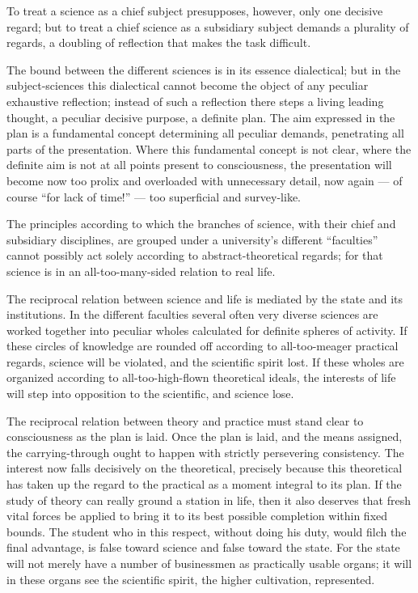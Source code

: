 \documentclass[12pt]{book}
\begin{document}
To treat a science as a chief subject presupposes, however, only one decisive regard; but to
treat a chief science as a subsidiary subject demands a plurality of regards, a doubling of
reflection that makes the task difficult.

The bound between the different sciences is in its essence dialectical; but in the
subject-sciences this dialectical cannot become the object of any peculiar exhaustive
reflection; instead of such a reflection there steps a living leading thought, a peculiar
decisive purpose, a definite plan. The aim expressed in the plan is a fundamental concept
determining all peculiar demands, penetrating all parts of the presentation. Where this
fundamental concept is not clear, where the definite aim is not at all points present to
consciousness, the presentation will become now too prolix and overloaded with unnecessary
detail, now again — of course ``for lack of time!'' — too superficial and survey-like.

The principles according to which the branches of science, with their chief and subsidiary
disciplines, are grouped under a university's
different ``faculties'' cannot possibly act solely according to abstract-theoretical regards;
for that science is in an all-too-many-sided relation to real life.

The reciprocal relation between science and life is mediated by the state and its
institutions. In the different faculties several often very diverse sciences are worked
together into peculiar wholes calculated for definite spheres of activity. If these circles
of knowledge are rounded off according to all-too-meager practical regards, science will be
violated, and the scientific spirit lost. If these wholes are organized according to
all-too-high-flown theoretical ideals, the interests of life will step into opposition to the
scientific, and science lose.

The reciprocal relation between theory and practice must stand clear to consciousness as the
plan is laid. Once the plan is laid, and the means assigned, the carrying-through ought to
happen with strictly persevering consistency. The interest now falls decisively on the
theoretical, precisely because this theoretical has taken up the regard to the practical as a
moment integral to its plan. If the study of theory can really ground a station in life, then
it also deserves that fresh vital forces be applied to bring it to its best possible
completion within fixed bounds. The student who in this respect, without doing his duty,
would filch the final advantage, is false toward science and false toward the state. For the
state will not merely have a number of businessmen as practically usable organs; it will in
these organs see the scientific spirit, the higher cultivation, represented.
\end{document}
